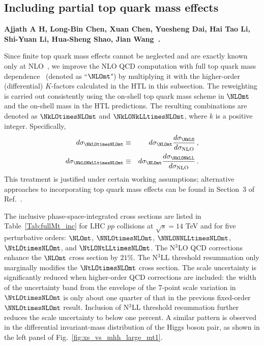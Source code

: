 \subsection{Including partial top quark mass effects}


\textbf{Ajjath A H, Long-Bin Chen, Xuan Chen, Yuesheng Dai, Hai Tao Li, Shi-Yuan Li, Hua-Sheng Shao, Jian Wang~\cite{Chen:2019fhs,Ajjath:2022kpv,Chen:2026zmi}.}

\noindent Since finite top quark mass effects cannot be neglected and are exactly known only at NLO~\cite{Borowka:2016ehy,Borowka:2016ypz,Baglio:2018lrj,Davies:2019dfy}, we improve the NLO QCD computation with full top quark mass dependence~\cite{Heinrich:2017kxx,Heinrich:2019bkc,Davies:2025qjr} (denoted as ``$\NLOmt$") by multiplying it with the higher-order (differential) $K$-factors calculated in the HTL in this subsection. The reweighting is carried out consistently using the on-shell top quark mass scheme in $\NLOmt$ and the on-shell mass in the HTL predictions. The resulting combinations are denoted as $\NkLOtimesNLOmt$ and $\NkLONkLLtimesNLOmt$, where $k$ is a positive integer. Specifically,
\begin{eqnarray}\label{NkLO-fullmt}
d\sigma_{\NkLOtimesNLOmt}&\equiv& d\sigma_{\NLOmt}\frac{d\sigma_{\NkLO}}{d\sigma_{\rm NLO}}\,,\nonumber\\
d\sigma_{\NkLONkLLtimesNLOmt}&\equiv&d\sigma_{\NLOmt}\frac{d\sigma_{\NkLONkLL}}{d\sigma_{\rm NLO}}\,.
\end{eqnarray}
This treatment is justified under certain working assumptions; alternative approaches to incorporating top quark mass effects can be found in Section~3 of Ref.~\cite{Chen:2019fhs}.




\begin{sloppypar}
The inclusive phase-space-integrated cross sections are listed in Table~\ref{Tab:fullMt_inc} for LHC $pp$ collisions at $\sqrt{s}=14$ TeV and for five perturbative orders: $\NLOmt$, $\NNLOtimesNLOmt$, $\NNLONNLLtimesNLOmt$, $\NtLOtimesNLOmt$, and $\NtLONtLLtimesNLOmt$. The N$^3$LO QCD corrections enhance the $\NLOmt$ cross section by $21\%$. The N$^3$LL threshold resummation only marginally modifies the $\NtLOtimesNLOmt$ cross section. The scale uncertainty is significantly reduced when higher-order QCD corrections are included: the width of the uncertainty band from the envelope of the $7$-point scale variation in $\NtLOtimesNLOmt$ is only about one quarter of that in the previous fixed-order $\NNLOtimesNLOmt$ result. Inclusion of N$^3$LL threshold resummation further reduces the scale uncertainty to below one percent. A similar pattern is observed in the differential invariant-mass distribution of the Higgs boson pair, as shown in the left panel of Fig.~\ref{fig:xs_vs_mhh_large_mt1}.
\end{sloppypar}

